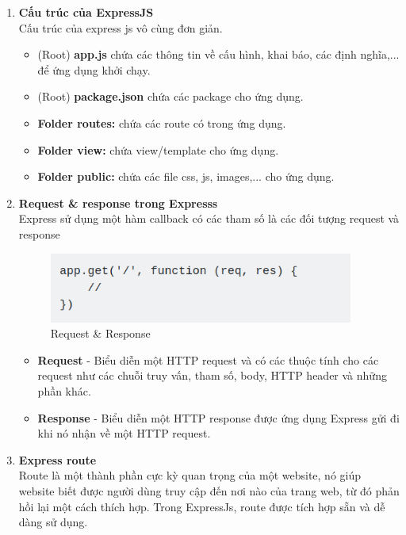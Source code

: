 \begin{enumerate}
\begin{itemize}
    \end{itemize}
    \item \textbf{Cấu trúc của ExpressJS}\\
    Cấu trúc của express js vô cùng đơn giản.
    \begin{itemize}
        \item (Root) \textbf{app.js} chứa các thông tin về cấu hình, khai báo, các định nghĩa,... để ứng dụng khởi chạy.
        \item (Root) \textbf{package.json} chứa các package cho ứng dụng.
        \item \textbf{Folder routes:} chứa các route có trong ứng dụng.
        \item \textbf{Folder view:} chứa view/template cho ứng dụng.
        \item \textbf{Folder public:} chứa các file css, js, images,... cho ứng dụng.
    \end{itemize}
    \item \textbf{Request \& response trong Expresss}\\
    Express sử dụng một hàm callback có các tham số là các đối tượng request và response
    \begin{figure}[H]
        \centering
        \includegraphics[width = 10cm]{image/res-req.png}
        \caption{Request \& Response}
        \label{fig:req_res}
    \end{figure}
    \begin{itemize}
        \item \textbf{Request} - Biểu diễn một HTTP request và có các thuộc tính cho các request như các chuỗi truy vấn, tham số, body, HTTP header và những phần khác.
        \item \textbf{Response} - Biểu diễn một HTTP response được ứng dụng Express gửi đi khi nó nhận về một HTTP request.
    \end{itemize}
    \item \textbf{Express route}\\
    Route là một thành phần cực kỳ quan trọng của một website, nó giúp website biết được người dùng truy cập đến nơi nào của trang web, từ đó phản hồi lại một cách thích hợp. Trong ExpressJs, route được tích hợp sẵn và dễ dàng sử dụng.
    \begin{enumerate}

\end{enumerate}
\end{enumerate}
